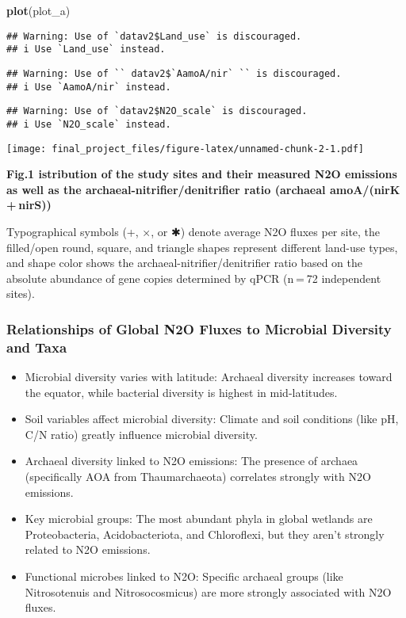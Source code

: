 \documentclass[
]{article}
\newenvironment{Shaded}{\begin{snugshade}}{\end{snugshade}}
\newcommand{\FunctionTok}[1]{\textcolor[rgb]{0.13,0.29,0.53}{\textbf{#1}}}
\newcommand{\NormalTok}[1]{#1}
\providecommand{\tightlist}{%
  \setlength{\itemsep}{0pt}\setlength{\parskip}{0pt}}
\begin{document}
\begin{Shaded}
\begin{Highlighting}[]
\FunctionTok{plot}\NormalTok{(plot\_a)}
\end{Highlighting}
\end{Shaded}

\begin{verbatim}
## Warning: Use of `datav2$Land_use` is discouraged.
## i Use `Land_use` instead.
\end{verbatim}

\begin{verbatim}
## Warning: Use of `` datav2$`AamoA/nir` `` is discouraged.
## i Use `AamoA/nir` instead.
\end{verbatim}

\begin{verbatim}
## Warning: Use of `datav2$N2O_scale` is discouraged.
## i Use `N2O_scale` instead.
\end{verbatim}

\texttt{[image: final\_project\_files/figure-latex/unnamed-chunk-2-1.pdf]}

\textbf{Fig.1 istribution of the study sites and their measured N2O
emissions as well as the archaeal-nitrifier/denitrifier ratio (archaeal
amoA/(nirK + nirS))}

Typographical symbols (+, ×, or ✱) denote average N2O fluxes per site,
the filled/open round, square, and triangle shapes represent different
land-use types, and shape color shows the archaeal-nitrifier/denitrifier
ratio based on the absolute abundance of gene copies determined by qPCR
(n = 72 independent sites).

\hypertarget{relationships-of-global-n2o-fluxes-to-microbial-diversity-and-taxa}{%
\subsubsection{\texorpdfstring{\textbf{Relationships of Global N2O
Fluxes to Microbial Diversity and
Taxa}}{Relationships of Global N2O Fluxes to Microbial Diversity and Taxa}}\label{relationships-of-global-n2o-fluxes-to-microbial-diversity-and-taxa}}

\begin{itemize}
\tightlist
\item
  Microbial diversity varies with latitude: Archaeal diversity increases
  toward the equator, while bacterial diversity is highest in
  mid-latitudes.
\item
  Soil variables affect microbial diversity: Climate and soil conditions
  (like pH, C/N ratio) greatly influence microbial diversity.
\item
  Archaeal diversity linked to N2O emissions: The presence of archaea
  (specifically AOA from Thaumarchaeota) correlates strongly with N2O
  emissions.
\item
  Key microbial groups: The most abundant phyla in global wetlands are
  Proteobacteria, Acidobacteriota, and Chloroflexi, but they aren't
  strongly related to N2O emissions.
\item
  Functional microbes linked to N2O: Specific archaeal groups (like
  Nitrosotenuis and Nitrosocosmicus) are more strongly associated with
  N2O fluxes.
\end{itemize}
\end{document}
